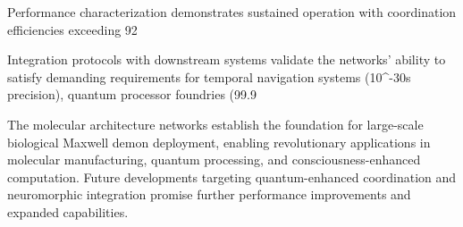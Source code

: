 Performance characterization demonstrates sustained operation with coordination efficiencies exceeding 92%

Integration protocols with downstream systems validate the networks' ability to satisfy demanding requirements for temporal navigation systems (10^{-30}s precision), quantum processor foundries (99.9%

The molecular architecture networks establish the foundation for large-scale biological Maxwell demon deployment, enabling revolutionary applications in molecular manufacturing, quantum processing, and consciousness-enhanced computation. Future developments targeting quantum-enhanced coordination and neuromorphic integration promise further performance improvements and expanded capabilities.
